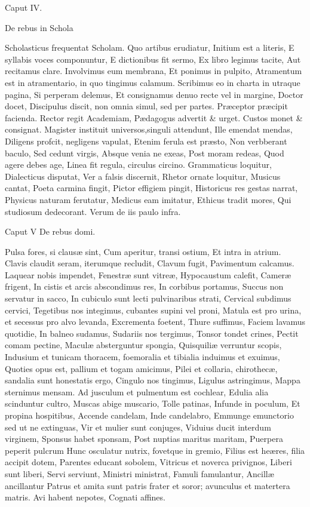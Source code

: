 Caput IV.

De rebus in Schola

Scholasticus frequentat Scholam.
Quo artibus erudiatur,
Initium est a literis,
E syllabis voces componuntur,
E dictionibus fit sermo,
Ex libro legimus tacite,
Aut recitamus clare.
Involvimus eum membrana,
Et ponimus in pulpito,
Atramentum est in atramentario, in quo tingimus calamum.
Scribimus eo in charta in utraque pagina,
Si perperam delemus,
Et consignamus denuo recte vel in margine,
Doctor docet,
Discipulus discit, non omnia simul, sed per partes.
Præceptor præcipit facienda.
Rector regit Academiam,
Pædagogus advertit & urget.
Custos monet & consignat.
Magister instituit universos,singuli attendunt,
Ille emendat mendas,
Diligens profcit, negligens vapulat,
Etenim ferula est præsto,
Non verbberant baculo,
Sed cedunt virgis,
Absque venia ne exeas,
Post moram redeas,
Quod agere debes age,
Linea fit regula, circulus circino.
Grammaticus loquitur,
Dialecticus disputat,
Ver a falsis discernit,
Rhetor ornate loquitur,
Musicus cantat,
Poeta carmina fingit,
Pictor effigiem pingit,
Historicus res gestas narrat,
Physicus naturam ferutatur,
Medicus eam imitatur,
Ethicus tradit mores,
Qui studiosum dedecorant.
Verum de iis paulo infra.


Caput V
De rebus domi.

Pulsa fores, si clausæ sint,
Cum aperitur, transi ostium,
Et intra in atrium.
Clavis claudit seram, iterumque recludit,
Clavum fugit,
Pavimentum calcamus. 
Laquear nobis impendet,
Fenestræ sunt vitreæ,
Hypocaustum calefit,
Cameræ frigent,
In cistis et arcis abscondimus res,
In corbibus portamus,
Succus non servatur in sacco,
In cubiculo sunt lecti pulvinaribus strati, 
Cervical subdimus cervici,
Tegetibus nos integimus, cubantes supini vel proni,
Matula est pro urina, et secessus pro alvo levanda,
Excrementa foetent,
Thure suffimus,
Faciem lavamus quotidie,
In balneo sudamus,
Sudariis nos tergimus,
Tonsor tondet crines,
Pectit comam pectine,
Maculæ absterguntur spongia,
Quisquiliæ verruntur scopis,
Indusium et tunicam thoracem, foemoralia et tibialia induimus et exuimus,
Quoties opus est, pallium et togam amicimus,
Pilei et collaria, chirothecæ, sandalia sunt honestatis ergo,
Cingulo nos tingimus,
Ligulus astringimus,
Mappa sternimus mensam.
Ad jusculum et pulmentum est cochlear,
Edulia alia scinduntur cultro,
Muscas abige muscario,
Tolle patinas,
Infunde in poculum,
Et propina hospitibus,
Accende candelam,
Inde candelabro,
Emmunge emunctorio sed ut ne extinguas,
Vir et mulier sunt conjuges,
Viduius ducit interdum virginem,
Sponsus habet sponsam,
Post nuptias maritus maritam,
Puerpera peperit pulcrum
Hunc osculatur nutrix, fovetque in gremio,
Filius est heæres, filia accipit dotem,
Parentes educant sobolem,
Vitricus et noverca privignos,
Liberi sunt liberi,
Servi serviunt,
Ministri ministrat,
Famuli famulantur,
Ancillæ ancillantur
Patrus et amita sunt patris frater et soror; avunculus et matertera matris.
Avi habent nepotes,
Cognati affines.

